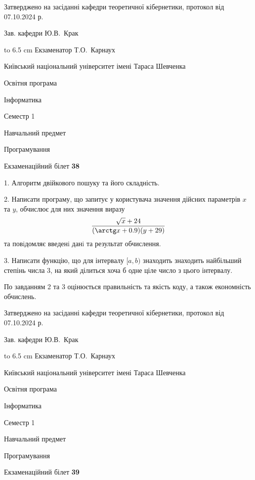 \documentclass[12pt, ukrainian]{article}
\begin{document}
{\smallskip\smallskip \begin {scriptsize} Затверджено на засіданні кафедри теоретичної кібернетики, протокол   від   07.10.2024 р.\par\smallskip\smallskip\smallskip\smallskip
{\parbox {6.5 cm} {Зав. кафедри \dotfill Ю.В.~Крак}}\hspace {0.7cm} {\hbox to 6.5 cm { Екзаменатор \dotfill Т.О.~Карнаух}} \end{scriptsize}}
\vspace{0.9cm}
{{\begin {scriptsize}\par
{ \center  Київський національний університет імені Тараса Шевченка \par}
{\parbox {5 cm}{Освітня програма \hfill}{\parbox {7 cm}{Інформатика\hfill}}\parbox {6 cm}{\hfill Семестр 1}}\par
{\parbox {5 cm} {Навчальний предмет \hfill}\parbox {7 cm}{Програмування \hfill}\parbox {6cm}{\hfill}\par}\vspace{-15pt} \end{scriptsize}}{\center Екзаменаційний білет \No \textbf { 38 }\par}}
{%
1. Алгоритм двійкового пошуку та його складність.%
\par
2. Написати програму, що запитує у користувача значення дійсних параметрів $x$ та $y$, обчислює для них значення виразу 
$$\frac{\sqrt x + 24}{(\arctg x + 0.9) (y + 29)}$$ 
та повiдомляє введенi данi та результат обчислення.

\par
3. Написати функцію, що для інтервалу $[a, b)$ знаходить знаходить найбільший степінь числа 3, на який ділиться хоча б одне ціле число з цього інтервалу.

По завданням 2 та 3 оцінюється правильність та якість коду, а також економність обчислень.

}
{\smallskip\smallskip \begin {scriptsize} Затверджено на засіданні кафедри теоретичної кібернетики, протокол   від   07.10.2024 р.\par\smallskip\smallskip\smallskip\smallskip
{\parbox {6.5 cm} {Зав. кафедри \dotfill Ю.В.~Крак}}\hspace {0.7cm} {\hbox to 6.5 cm { Екзаменатор \dotfill Т.О.~Карнаух}} \end{scriptsize}}
\vspace{0.9cm}
{{\begin {scriptsize}\par
{ \center  Київський національний університет імені Тараса Шевченка \par}
{\parbox {5 cm}{Освітня програма \hfill}{\parbox {7 cm}{Інформатика\hfill}}\parbox {6 cm}{\hfill Семестр 1}}\par
{\parbox {5 cm} {Навчальний предмет \hfill}\parbox {7 cm}{Програмування \hfill}\parbox {6cm}{\hfill}\par}\vspace{-15pt} \end{scriptsize}}{\center Екзаменаційний білет \No \textbf { 39 }\par}}
\end{document}
